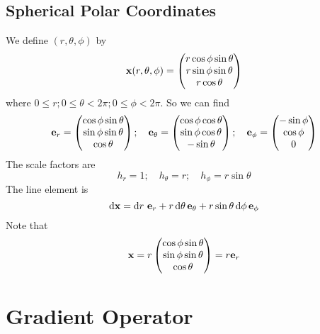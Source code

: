 \documentclass{article}
\begin{document}
\subsection{Spherical Polar Coordinates}
We define $(r, \theta, \phi)$ by
\[ \vb x(r, \theta, \phi) = \begin{pmatrix}
		r \cos \phi \sin \theta \\
		r \sin \phi \sin \theta \\
		r \cos \theta
	\end{pmatrix} \]
where $0 \leq r; 0 \leq \theta < 2 \pi; 0 \leq \phi < 2 \pi$. So we can find
\[ \vb e_r = \begin{pmatrix}
		\cos \phi \sin \theta \\ \sin \phi \sin \theta \\ \cos \theta
	\end{pmatrix};\quad \vb e_\theta = \begin{pmatrix}
		\cos \phi \cos \theta \\ \sin \phi \cos \theta \\ -\sin \theta
	\end{pmatrix};\quad \vb e_\phi = \begin{pmatrix}
		-\sin \phi \\ \cos \phi \\ 0
	\end{pmatrix} \]
The scale factors are
\[ h_r = 1;\quad h_\theta = r;\quad h_\phi = r \sin \theta \]
The line element is
\[ \dd \vb x = \dd{r} \, \vb e_r + r \, \dd \theta \, \vb e_\theta + r \sin \theta \, \dd \phi \, \vb e_\phi \]
Note that
\[ \vb x = r \begin{pmatrix}
		\cos \phi \sin \theta \\ \sin \phi \sin \theta \\ \cos \theta
	\end{pmatrix} = r \vb e_r \]

\section{Gradient Operator}
\end{document}
